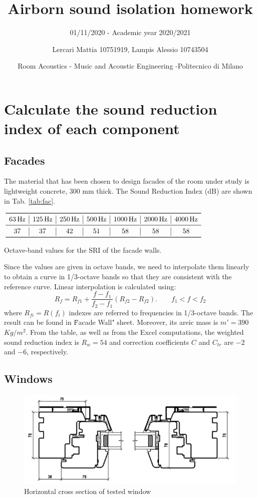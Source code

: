 \documentclass[]{scrartcl}
\title{Airborn sound isolation homework}
\date{Room Acoustics - Music and Acoustic Engineering -Politecnico di Milano}
\author{Lercari Mattia 10751919, Lampis Alessio 10743504}
\subtitle{01/11/2020 - Academic year 2020/2021}
\begin{document}
\maketitle

\section{Calculate the sound reduction index of each component}
\subsection{Facades}
The material that has been chosen to design facades of the room under study is lightweight concrete, $300$ mm  thick. The Sound Reduction Index (dB) are shown in Tab. \ref{tab:fac}. 
\begin{table}[h]
	\centering
	$\begin{array}{c|c|c|c|c|c|c}
	\toprule
	\SI{63}{\hertz} & \SI{125}{\hertz} & \SI{250}{\hertz} & \SI{500}{\hertz}  & \SI{1000}{\hertz} & \SI{2000}{\hertz} & \SI{4000}{\hertz} \\
	\midrule
	37 & 37 & 42 & 51 & 58 & 58 & 58 \\
	\bottomrule
	\end{array}$
	\caption{Octave-band values for the SRI of the facade walls.}
	\label{tab:fac}
\end{table} 
Since the values are given in octave bands, we need to interpolate them linearly to obtain a curve in 1/3-octave bands so that they are consistent with the reference curve. Linear interpolation is calculated using:
\begin{equation}
	R_f = R_{f1} + \frac{f - f_1}{f_2 - f_1}(R_{f2} - R_{f2}). \quad \quad  f_1<f<f_2
\end{equation} where $R_{fi} = R(f_i)$ indexes are referred to frequencies in  1/3-octave bands. The result can be found in \"Facade Wall" sheet. Moreover, its areic mass is $m'= 390 $ $ Kg/m^2$. From the table, as well as from the Excel computations, the weighted sound reduction index is $R_w = 54$ and correction coefficients $C$ and $C_{tr}$ are $-2$ and $-6$, respectively. 
\subsection{Windows}

\begin{figure}[h]
	\centering
	\includegraphics[width=0.7\linewidth]{windows_profile}
	\caption{Horizontal cross section of tested window}
	\label{fig:windowsprofile}
\end{figure}
\end{document}
